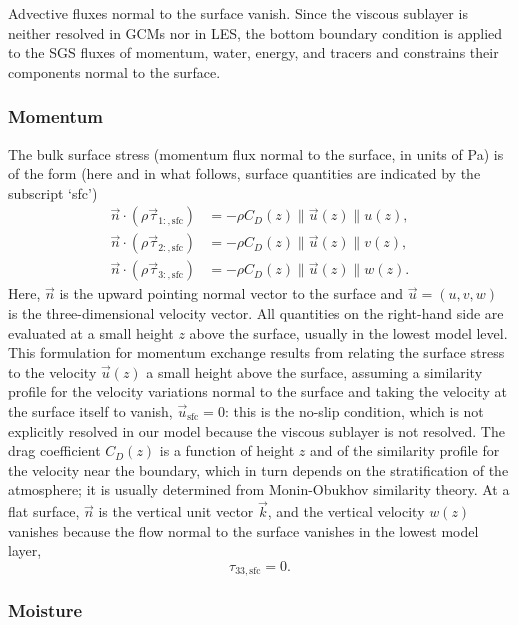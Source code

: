 \documentclass{report}
\begin{document}
Advective fluxes normal to the surface vanish. Since the viscous sublayer is neither resolved in GCMs nor in LES, the bottom boundary condition is applied to the SGS fluxes of momentum, water, energy, and tracers and constrains their components normal to the surface. 

\subsubsection{Momentum}

The bulk surface stress (momentum flux normal to the surface, in units of Pa) is of the form (here and in what follows, surface quantities are indicated by the subscript `sfc')
\begin{subequations}
\begin{align}
\vec{n} \cdot (\rho\vec{\tau}_{1:, \mathrm{sfc}}) & = -\rho C_D(z) \|\vec{u}(z)\| u(z), \\
\vec{n} \cdot (\rho\vec{\tau}_{2:, \mathrm{sfc}}) & = -\rho C_D(z) \|\vec{u}(z)\| v(z),\\
\vec{n} \cdot (\rho\vec{\tau}_{3:, \mathrm{sfc}}) & = -\rho C_D(z) \|\vec{u}(z)\| w(z).
\end{align}
\end{subequations}
Here, $\vec{n}$ is the upward pointing normal vector to the surface and $\vec{u} = (u, v, w)$ is the three-dimensional velocity vector. All quantities on the right-hand side are evaluated at a small height $z$ above the surface, usually in the lowest model level. This formulation for momentum exchange results from relating the surface stress to the velocity $\vec{u}(z)$ a small height above the surface, assuming a similarity profile for the velocity variations normal to the surface and taking the velocity at the surface itself to vanish, $\vec{u}_\mathrm{sfc} =0$: this is the no-slip condition, which is not explicitly resolved in our model because the viscous sublayer is not resolved. The drag coefficient  $C_D(z)$ is a function of height $z$ and of the similarity profile for the velocity near the boundary, which in turn depends on the stratification of the atmosphere; it is usually determined from Monin-Obukhov similarity theory. At a flat surface, $\vec{n}$ is the vertical unit vector $\vec{k}$, and the vertical velocity $w(z)$ vanishes because the flow normal to the surface vanishes in the lowest model layer,
\[
\tau_{33, \mathrm{sfc}} = 0.
\]

\subsubsection{Moisture} 
\end{document}
